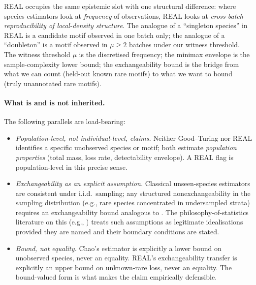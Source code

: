 REAL occupies the same epistemic slot with one structural difference: where species estimators look at \emph{frequency} of observations, REAL looks at \emph{cross-batch reproducibility of local-density structure}. The analogue of a ``singleton species'' in REAL is a candidate motif observed in one batch only; the analogue of a ``doubleton'' is a motif observed in $\mu \geq 2$ batches under our witness threshold. The witness threshold $\mu$ is the discretised frequency; the minimax envelope  is the sample-complexity lower bound; the exchangeability bound  is the bridge from what we can count (held-out known rare motifs) to what we want to bound (truly unannotated rare motifs).

\paragraph*{What is and is not inherited.}
The following parallels are load-bearing:
\begin{itemize}[leftmargin=*]
  \item \emph{Population-level, not individual-level, claims.} Neither Good--Turing nor REAL identifies a specific unobserved species or motif; both estimate \emph{population properties} (total mass, loss rate, detectability envelope). A REAL flag is population-level in this precise sense.
  \item \emph{Exchangeability as an explicit assumption.} Classical unseen-species estimators are consistent under i.i.d.\ sampling; any structured nonexchangeability in the sampling distribution (e.g., rare species concentrated in undersampled strata) requires an exchangeability bound analogous to . The philosophy-of-statistics literature on this (e.g., \citet{potochnik2017idealization}) treats such assumptions as legitimate idealisations provided they are named and their boundary conditions are stated.
  \item \emph{Bound, not equality.} Chao's estimator is explicitly a lower bound on unobserved species, never an equality. REAL's exchangeability transfer is explicitly an upper bound on unknown-rare loss, never an equality. The bound-valued form is what makes the claim empirically defensible.
\end{itemize}

